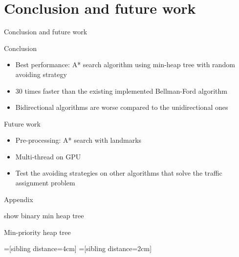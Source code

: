 \documentclass{beamer}
\begin{document}
\section{Conclusion and future work}
\begin{frame}{Conclusion and future work}
    \begin{block}{Conclusion}
        \begin{itemize}
            \itemsep.5em
            \item Best performance: A* search algorithm using min-heap tree with random avoiding strategy
            \item 30 times faster than the existing implemented Bellman-Ford algorithm
            \item Bidirectional algorithms are worse compared to the unidirectional ones
        \end{itemize}
    \end{block}

    \begin{block}{Future work}
        \begin{itemize}
            \itemsep.5em
            \item Pre-processing: A* search with landmarks
            \item Multi-thread on GPU
            \item Test the avoiding strategies on other algorithms that solve the traffic assignment problem
        \end{itemize}
    \end{block}
\end{frame}

\begin{frame}[c, noframenumbering]
    \begin{center}
        \Huge
        Appendix

        show binary min heap tree
    \end{center}
\end{frame}

\appendix
\begin{frame}[noframenumbering]{Min-priority heap tree}
    \begin{center}
    =[sibling distance=4cm]
    =[sibling distance=2cm]
    \end{center}
\end{frame}
\end{document}
